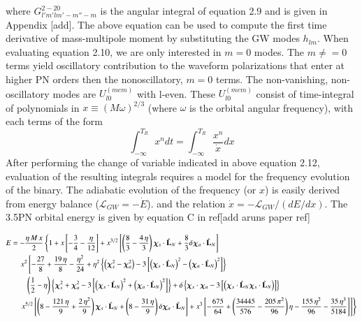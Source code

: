 \documentclass[prd,preprintnumbers,twocolumn,eqsecnum,floatfix,letter]{revtex4}
\begin{document}
where $G^{2-20}_{l'm'lm'-m''-m}$ is the angular integral of equation 2.9 and is given in Appendix [add]. The above equation can be used to compute the first time derivative of mass-multipole moment by substituting the GW modes $h_{lm}$. When evaluating equation 2.10, we are only interested in $m=0$ modes. The $m\neq=0$ terms yield oscillatory contribution to the waveform polarizations that enter at higher PN orders then the nonoscillatory, $m=0$ terms. The non-vanishing, non-oscillatory modes are $U^{(mem)}_{l0}$ with l-even. These $U^{(mem)}_{l0}$ consist of time-integral of polynomials in $x\equiv(M\omega)^{2/3}$ (where $\omega$ is the orbital angular frequency), with each terms of the form
\begin{equation}
\int_{-\infty}^{T_{R}} x^{n}dt=\int_{-\infty}^{T_{R}}\frac{x^{n}}{\dot{x}}dx
\end{equation}
After performing the change of variable indicated in above equation 2.12, evaluation of the resulting integrals requires a model for the frequency evolution of the binary. The adiabatic evolution of the frequency (or $x$) is easily derived from energy balance ($\mathcal{L}_{GW}=-\dot{E}$). and the relation $\dot{x}=-\mathcal{L}_{GW}/(dE/dx)$. The 3.5PN orbital energy is given by equation C in ref[add aruns paper ref]
\begin{widetext}
	\begin{align}\label{eq:E}
	E&=-\frac{\eta \, M \, x}{2}\left\{1 + x \left[-\frac{3}{4}-\frac{\eta}{12}\right] + x^{3/2}\left[\left(\frac{8}{3} - \frac{4 \, \eta}{3}\right)\bm{\chi}_s \cdot \hat{\mathbf{L}}_N + \frac{8}{3}\delta\bm{\chi}_a \cdot \hat{\mathbf{L}}_N\right]\right. \nonumber \\
	& \quad \left. x^2\left[-\frac{27}{8} + \frac{19 \, \eta}{8}-\frac{\eta^2}{24} + \eta^2 \left\{\left(\bm{\chi}_s^2-\bm{\chi}_a^2\right) -3\left[\left(\bm{\chi}_s \cdot \hat{\mathbf{L}}_N\right)^2 - \left(\bm{\chi}_a \cdot \hat{\mathbf{L}}_N\right)^2\right]\right\}\right.\right. \nonumber \\
	& \qquad \left(\frac{1}{2}-\eta\right)\left\{\bm{\chi}_s^2+\bm{\chi}_a^2-3\left[\left(\bm{\chi}_s \cdot \hat{\mathbf{L}}_N\right)^2+\left(\bm{\chi}_a \cdot \hat{\mathbf{L}}_N\right)^2\right]\right\}+\delta\left\{\bm{\chi}_s \cdot \bm{\chi}_a-3\left[\left(\bm{\chi}_s \cdot \hat{\mathbf{L}}_N\bm{\chi}_s \cdot \hat{\mathbf{L}}_N\right)\right]\right\} \nonumber\\
	& \quad \left.\left.x^{5/2}\left[\left(8-\frac{121\,\eta}{9} +  \frac{2\,\eta^2}{9}\right)\bm{\chi}_s \cdot \hat{\mathbf{L}}_N + \left(8-\frac{31\,\eta}{9}\right)\delta\bm{\chi}_a \cdot \hat{\mathbf{L}}_N\right] + x^3\left[-\frac{675}{64}+\left(\frac{34445}{576}-\frac{205\,\pi^2}{96}\right)\eta-\frac{155\,\eta^2}{96}-\frac{35\,\eta^3}{5184}\right]
	\right]
	\right\}
	\end{align}
\end{widetext}
\end{document}
